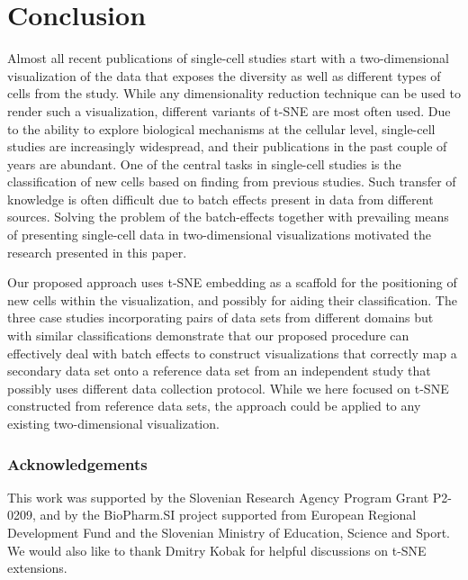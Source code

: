 \documentclass[runningheads]{llncs}
\begin{document}
\section{Conclusion}

Almost all recent publications of single-cell studies start with a two-dimensional visualization of the data that exposes the diversity as well as different types of cells from the study. While any dimensionality reduction technique can be used to render such a visualization, different variants of t-SNE are most often used. Due to the ability to explore biological mechanisms at the cellular level, single-cell studies are increasingly widespread, and their publications in the past couple of years are abundant. One of the central tasks in single-cell studies is the classification of new cells based on finding from previous studies. Such transfer of knowledge is often difficult due to batch effects present in data from different sources. Solving the problem of the batch-effects together with prevailing means of presenting single-cell data in two-dimensional visualizations motivated the research presented in this paper. 

Our proposed approach uses t-SNE embedding as a scaffold for the positioning of new cells within the visualization, and possibly for aiding their classification. The three case studies incorporating pairs of data sets from different domains but with similar classifications demonstrate that our proposed procedure can effectively deal with batch effects to construct visualizations that correctly map a secondary data set onto a reference data set from an independent study that possibly uses different data collection protocol. While we here focused on t-SNE constructed from reference data sets, the approach could be applied to any existing two-dimensional visualization.

\subsubsection*{Acknowledgements}

This work was supported by the Slovenian Research Agency Program Grant P2-0209, and by the BioPharm.SI project supported from European Regional Development Fund and the Slovenian Ministry of Education, Science and Sport. We would also like to thank Dmitry Kobak for helpful discussions on t-SNE extensions.





\end{document}
